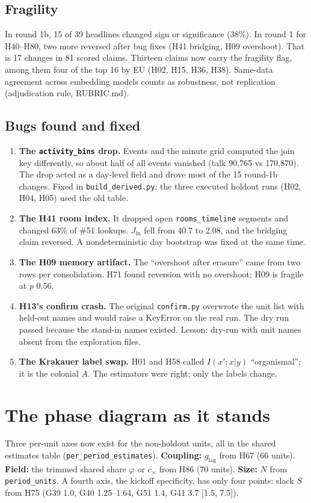 \documentclass[aps,pre,reprint,10pt,nofootinbib]{revtex4-2}
\begin{document}
\subsection{Fragility}
In round 1b, 15 of 39 headlines changed sign or significance (38\%). In round 1 for H40--H80, two more reversed after bug fixes (H41 bridging, H09 overshoot). That is 17 changes in 81 scored claims. Thirteen claims now carry the fragility flag, among them four of the top 16 by EU (H02, H15, H36, H38). Same-data agreement across embedding models counts as robustness, not replication (adjudication rule, RUBRIC.md).

\subsection{Bugs found and fixed}\label{sec:bugs}
\begin{enumerate}
\item \textbf{The \texttt{activity\_bins} drop.} Events and the minute grid computed the join key differently, so about half of all events vanished (talk 90{,}765 vs 170{,}870). The drop acted as a day-level field and drove most of the 15 round-1b changes. Fixed in \texttt{build\_derived.py}; the three executed holdout runs (H02, H04, H05) used the old table.
\item \textbf{The H41 room index.} It dropped open \texttt{rooms\_timeline} segments and changed 63\% of \#51 lookups. $J_\mathrm{in}$ fell from 40.7 to 2.08, and the bridging claim reversed. A nondeterministic day bootstrap was fixed at the same time.
\item \textbf{The H09 memory artifact.} The ``overshoot after erasure'' came from two rows per consolidation. H71 found reversion with no overshoot; H09 is fragile at $p$ 0.56.
\item \textbf{H13's confirm crash.} The original \texttt{confirm.py} overwrote the unit list with held-out names and would raise a KeyError on the real run. The dry run passed because the stand-in names existed. Lesson: dry-run with unit names absent from the exploration files.
\item \textbf{The Krakauer label swap.} H01 and H58 called $I(x';x|y)$ ``organismal''; it is the colonial $A$. The estimators were right; only the labels change.
\end{enumerate}

\section{The phase diagram as it stands}
Three per-unit axes now exist for the non-holdout units, all in the shared estimates table (\texttt{per\_period\_estimates}). \textbf{Coupling:} $g_\mathrm{lag}$ from H67 (66 units). \textbf{Field:} the trimmed shared share $\varphi$ or $c_\times$ from H86 (70 units). \textbf{Size:} $N$ from \texttt{period\_units}. A fourth axis, the kickoff specificity, has only four points: slack $S$ from H75 (G39 1.0, G40 1.25--1.64, G51 1.4, G41 3.7 [1.5, 7.5]).
\end{document}
